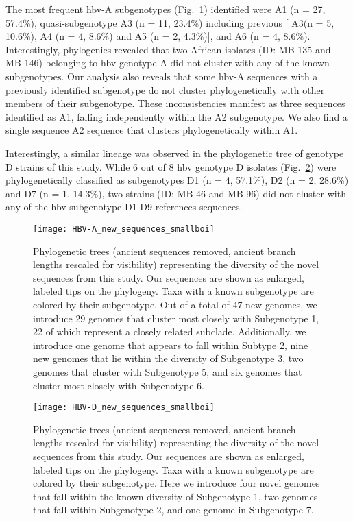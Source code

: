 The most frequent \gls{hbv}-A subgenotypes (Fig.~\ref{fig:HBV-A_new_sequences}) identified were A1 (n = 27, 57.4\%), quasi-subgenotype A3 (n = 11, 23.4\%) including previous [ A3(n = 5, 10.6\%), A4 (n = 4, 8.6\%) and A5 (n = 2, 4.3\%)], and A6 (n = 4, 8.6\%).
Interestingly, phylogenies revealed that two African isolates (ID: MB-135 and MB-146) belonging to \gls{hbv} genotype A did not cluster with any of the known subgenotypes.
Our analysis also reveals that some \gls{hbv}-A sequences with a previously identified subgenotype do not cluster phylogenetically with other members of their subgenotype.
These inconsistencies manifest as three sequences identified as A1, falling independently within the A2 subgenotype.
We also find a single sequence A2 sequence that clusters phylogenetically within A1.

Interestingly, a similar lineage was observed in the phylogenetic tree of genotype D strains of this study.
While 6 out of 8 \gls{hbv} genotype D isolates (Fig.~\ref{fig:HBV-D_new_sequences}) were phylogenetically classified as subgenotypes D1 (n = 4, 57.1\%), D2 (n = 2, 28.6\%) and D7 (n = 1, 14.3\%), two strains (ID: MB-46 and MB-96) did not cluster with any of the \gls{hbv} subgenotype D1-D9 references sequences.


\begin{figure}[ht]
  \centering
  \medskip
  \texttt{[image: HBV-A\_new\_sequences\_smallboi]}
  \caption[HBV-A New sequences]{Phylogenetic trees (ancient sequences removed, ancient branch lengths rescaled for visibility) representing the diversity of the novel sequences from this study. Our sequences are shown as enlarged, labeled tips on the phylogeny. Taxa with a known subgenotype are colored by their subgenotype. Out of a total of 47 new genomes, we introduce 29 genomes that cluster most closely with Subgenotype 1, 22 of which represent a closely related subclade. Additionally, we introduce one genome that appears to fall within Subtype 2, nine new genomes that lie within the diversity of Subgenotype 3, two genomes that cluster with Subgenotype 5, and six genomes that cluster most closely with Subgenotype 6.}
  \label{fig:HBV-A_new_sequences}
\end{figure}

\begin{figure}[ht]
  \centering
  \medskip
  \texttt{[image: HBV-D\_new\_sequences\_smallboi]}
  \caption[HBV-D New sequences]{Phylogenetic trees (ancient sequences removed, ancient branch lengths rescaled for visibility) representing the diversity of the novel sequences from this study. Our sequences are shown as enlarged, labeled tips on the phylogeny. Taxa with a known subgenotype are colored by their subgenotype. Here we introduce four novel genomes that fall within the known diversity of Subgenotype 1, two genomes that fall within Subgenotype 2, and one genome in Subgenotype 7.}
  \label{fig:HBV-D_new_sequences}
\end{figure}

